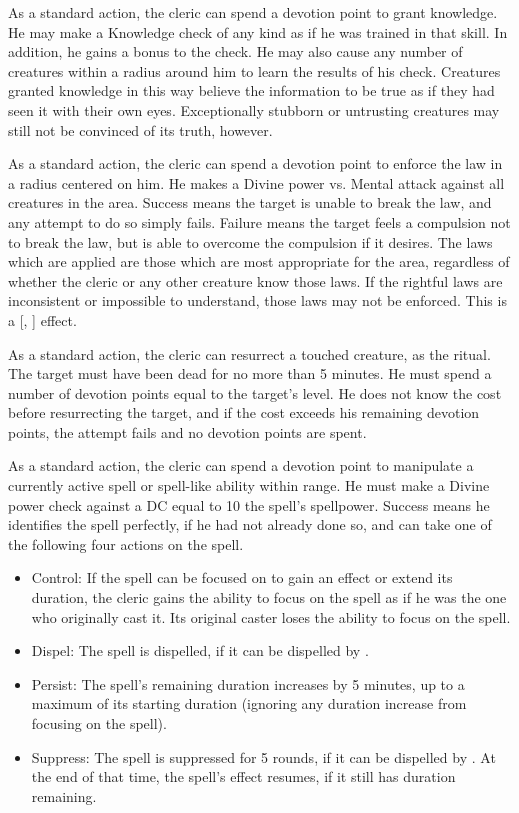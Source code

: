 As a standard action, the cleric can spend a devotion point to grant knowledge.
He may make a Knowledge check of any kind as if he was trained in that skill.
In addition, he gains a  bonus to the check.
He may also cause any number of creatures within a \arealarge radius around him to learn the results of his check.
Creatures granted knowledge in this way believe the information to be true as if they had seen it with their own eyes.
Exceptionally stubborn or untrusting creatures may still not be convinced of its truth, however.

As a standard action, the cleric can spend a devotion point to enforce the law in a \arealarge radius  centered on him.
He makes a Divine power vs. Mental attack against all creatures in the area.
Success means the target is unable to break the law, and any attempt to do so simply fails.
Failure means the target feels a compulsion not to break the law, but is able to overcome the compulsion if it desires.
The laws which are applied are those which are most appropriate for the area, regardless of whether the cleric or any other creature know those laws.
If the rightful laws are inconsistent or impossible to understand, those laws may not be enforced.
This is a [, ] effect.

As a standard action, the cleric can resurrect a touched creature, as the  ritual.
The target must have been dead for no more than 5 minutes.
He must spend a number of devotion points equal to the target's level.
He does not know the cost before resurrecting the target, and if the cost exceeds his remaining devotion points, the attempt fails and no devotion points are spent.

As a standard action, the cleric can spend a devotion point to manipulate a currently active spell or spell-like ability within \rngmed range.
He must make a Divine power check against a DC equal to 10 \add the spell's spellpower.
Success means he identifies the spell perfectly, if he had not already done so, and can take one of the following four actions on the spell.
\begin{itemize}
    \item Control: If the spell can be focused on to gain an effect or extend its duration, the cleric gains the ability to focus on the spell as if he was the one who originally cast it.
        Its original caster loses the ability to focus on the spell.
    \item Dispel: The spell is dispelled, if it can be dispelled by .
    \item Persist: The spell's remaining duration increases by 5 minutes, up to a maximum of its starting duration (ignoring any duration increase from focusing on the spell).
    \item Suppress: The spell is suppressed for 5 rounds, if it can be dispelled by .
        At the end of that time, the spell's effect resumes, if it still has duration remaining.
\end{itemize}

